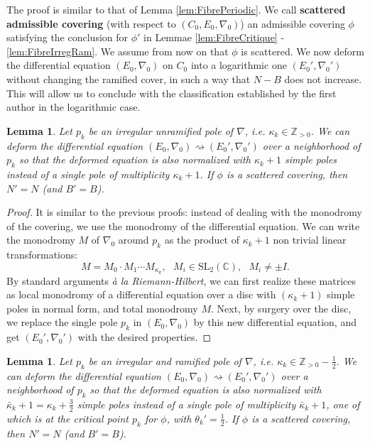 \documentclass[12]{amsart}
\newtheorem{lem}[thm]{Lemma}
\newcommand{\SL}{\mathrm{SL}_2}
\begin{document}
The proof is similar to that of Lemma \ref{lem:FibrePeriodic}. We call {\bf scattered admissible covering} 
(with respect to $(C_0,E_0,\nabla_0)$)
an admissible covering $\phi$ satisfying the conclusion for $\phi'$ in Lemmae \ref{lem:FibreCritique} - \ref{lem:FibreIrregRam}. 
We assume from now on that $\phi$ is scattered. We now deform the differential equation $(E_0,\nabla_0)$ on $C_0$
into a logarithmic one $(E_0',\nabla_0')$ without changing the ramified cover, in such a way that $N-B$ does not increase.
This will allow us to conclude with the classification established by the first author \cite{Diarra1} in the logarithmic case.

\begin{lem}\label{lem:IrregPoleLogPole}
Let $p_k$ be an irregular unramified pole of $\nabla$, i.e. $\kappa_k\in\mathbb Z_{>0}$.
We can deform the differential equation $(E_0,\nabla_0)\rightsquigarrow(E_0',\nabla_0')$ over a neighborhood of $p_k$ 
so that the deformed equation is also normalized with $\kappa_k+1$ simple poles instead 
of a single pole of multiplicity $\kappa_k+1$. If $\phi$ is a scattered covering, then $N'=N$ (and $B'=B$).
\end{lem}

\begin{proof}It is similar to the previous proofs: instead of dealing with the monodromy of the covering, 
we use the monodromy of the differential equation. We can write the monodromy $M$ of $\nabla_0$ around $p_k$
as the product of $\kappa_k+1$ non trivial linear transformations:
$$M=M_0\cdot M_1\cdots M_{\kappa_k},\ \ \ M_i\in\SL(\mathbb C),\ \ \ M_i\not=\pm I.$$
By standard arguments {\it \`a la Riemann-Hilbert}, we can first realize these matrices as local monodromy
of a differential equation over a disc with $(\kappa_k+1)$ simple poles in normal form, and total monodromy $M$.
Next, by surgery over the disc, we replace the single pole $p_k$ in $(E_0,\nabla_0)$ by this new differential 
equation, and get $(E_0',\nabla_0')$ with the desired properties.
\end{proof}

\begin{lem}\label{lem:IrregRamPoleLogPole}
Let $p_k$ be an irregular and ramified pole of $\nabla$, i.e. $\kappa_k\in\mathbb Z_{>0}-\frac{1}{2}$.
We can deform the differential equation $(E_0,\nabla_0)\rightsquigarrow(E_0',\nabla_0')$ over a neighborhood of $p_k$ 
so that the deformed equation is also normalized with $\bar\kappa_k+1=\kappa_k+\frac{3}{2}$ simple poles instead 
of a single pole of multiplicity $\bar\kappa_k+1$, one of which is at the critical point $p_k$ for $\phi$, with $\theta_k'=\frac{1}{2}$. If $\phi$ is a scattered covering, then $N'=N$ (and $B'=B$).
\end{lem}
\end{document}
